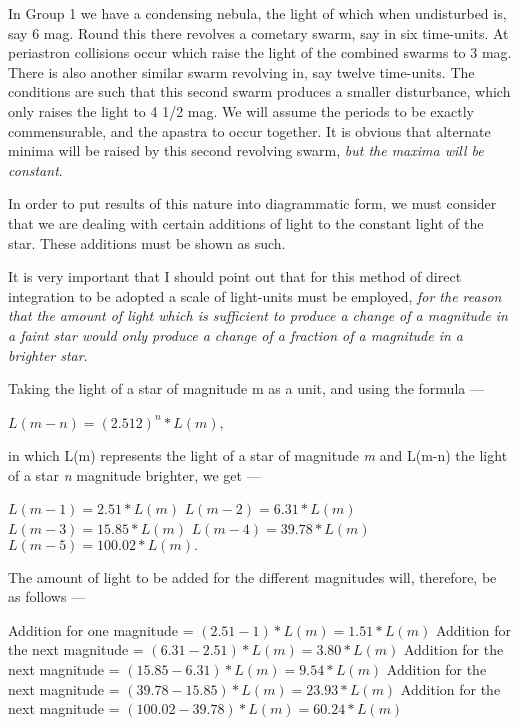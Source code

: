 \documentclass[a4paper, 12pt, oneside, polutonikogreek, english]{article}
\begin{document}
In Group 1 we have a condensing nebula, the light of which when undisturbed is, say 6 mag. Round this there revolves a cometary swarm, say in six time-units. At periastron collisions occur which raise the light of the combined swarms to 3 mag. There is also another similar swarm revolving in, say twelve time-units. The conditions are such that this second swarm produces a smaller disturbance, which only raises the light to 4 1/2 mag. We will assume the periods to be exactly commensurable, and the apastra to occur together. It is obvious that alternate minima will be raised by this second revolving swarm, \emph{but the maxima will be constant}.

In order to put results of this nature into diagrammatic form, we must consider that we are dealing with certain additions of light to the constant light of the star. These additions must be shown as such.

It is very important that I should point out that for this method of direct integration to be adopted a scale of light-units must be employed, \emph{for the reason that the amount of light which is sufficient to produce a change of a magnitude in a faint star would only produce a change of a fraction of a magnitude in a brighter star}.

Taking the light of a star of magnitude m as a unit, and using the formula ---

$L(m-n) = (2.512)^n * L(m)$,

in which L(m) represents the light of a star of magnitude \emph{m} and L(m-n) the light of a star \emph{n} magnitude brighter, we get ---

$L(m-1) = 2.51 * L(m)$ 
$L(m-2) = 6.31 * L(m)$
$L(m-3) = 15.85 * L(m)$
$L(m-4) = 39.78 * L(m)$
$L(m-5) = 100.02 * L(m).$

The amount of light to be added for the different magnitudes will, therefore, be as follows ---

Addition for one magnitude = $(2.51 - 1) * L(m) = 1.51 * L(m)$ 
Addition for the next magnitude = $(6.31 - 2.51) * L(m) = 3.80 * L(m)$
Addition for the next magnitude = $(15.85 - 6.31) * L(m) = 9.54 * L(m)$ 
Addition for the next magnitude = $(39.78 - 15.85) * L(m) = 23.93 * L(m)$
Addition for the next magnitude = $(100.02 - 39.78) * L(m) = 60.24 * L(m)$
\end{document}
